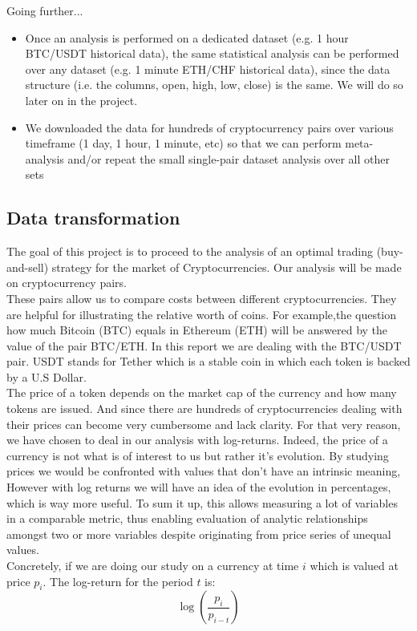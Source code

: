 \documentclass[twoside]{report}
\begin{document}
\begin{spacing}{1}
\begin{itemize}
\end{itemize}


Going further...

\begin{itemize}
    \item 
Once an analysis is performed on a dedicated dataset (e.g. 1 hour BTC/USDT historical data), the same statistical analysis can be performed over any dataset (e.g. 1 minute ETH/CHF historical data), since the data structure (i.e. the columns, open, high, low, close) is the same. We will do so later on in the project.
    \item
We downloaded the data for hundreds of cryptocurrency pairs over various timeframe (1 day, 1 hour, 1 minute, etc) so that we can perform meta-analysis and/or repeat the small single-pair dataset analysis over all other sets

\end{itemize}



\subsection{Data transformation}

The goal of this project is to proceed to the analysis of an optimal trading (buy-and-sell) strategy for the market of Cryptocurrencies. Our analysis will be made on cryptocurrency pairs.\\
These pairs allow us to compare costs between different cryptocurrencies. They are helpful for illustrating the relative worth of coins. For example,the question how much Bitcoin (BTC) equals in Ethereum (ETH) will be answered by the value of the pair BTC/ETH.
In this report we are dealing with the BTC/USDT pair. USDT stands for Tether which is a stable coin in which each token is backed by a U.S Dollar.\\
The price of a token depends on the market cap of the currency and how many tokens are issued. And since there are hundreds of cryptocurrencies dealing with their prices can become very cumbersome and lack clarity. For that very reason, we have chosen to deal in our analysis with log-returns.
Indeed, the price of a currency is not what is of interest to us but rather it's evolution. By studying prices we would be confronted with values that don't have an intrinsic meaning, However with log returns we will have an idea of the evolution in percentages, which is way more useful. To sum it up, this allows measuring a lot of variables in a comparable metric, thus enabling evaluation of analytic relationships amongst two or more variables despite originating from price series of unequal values. \\
Concretely, if we are doing our study on a currency at time $i$ which is valued at price $p_i$. The log-return for the period $t$ is:
$$\log\left(\frac{p_i}{p_{i-t}}\right)$$\\


\end{spacing}
\end{document}
